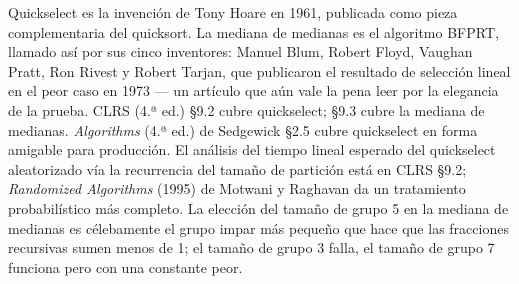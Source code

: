 \documentclass[11pt,a4paper]{article}
\begin{document}
Quickselect es la invención de Tony Hoare en 1961, publicada como pieza complementaria del quicksort. La mediana de medianas es el algoritmo BFPRT, llamado así por sus cinco inventores: Manuel Blum, Robert Floyd, Vaughan Pratt, Ron Rivest y Robert Tarjan, que publicaron el resultado de selección lineal en el peor caso en 1973 --- un artículo que aún vale la pena leer por la elegancia de la prueba. CLRS (4.ª ed.) \S 9.2 cubre quickselect; \S 9.3 cubre la mediana de medianas. \emph{Algorithms} (4.ª ed.) de Sedgewick \S 2.5 cubre quickselect en forma amigable para producción. El análisis del tiempo lineal esperado del quickselect aleatorizado vía la recurrencia del tamaño de partición está en CLRS \S 9.2; \emph{Randomized Algorithms} (1995) de Motwani y Raghavan da un tratamiento probabilístico más completo. La elección del tamaño de grupo 5 en la mediana de medianas es célebamente el grupo impar más pequeño que hace que las fracciones recursivas sumen menos de 1; el tamaño de grupo 3 falla, el tamaño de grupo 7 funciona pero con una constante peor.
\end{document}
